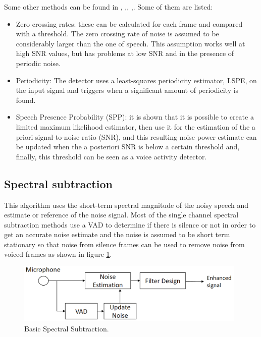 Some other methods can be found in \cite{Faneuff2002SpatialCar}, \cite{Rubio2007Two-microphoneEstimates},\cite{Rosca2002MultichannelEnvironments}, \cite{Gerkmann2011NoisePresence},\cite{Nelke2013DualProbability}. Some of them are listed:

\begin{itemize}
\item Zero crossing rates: these can be calculated for each frame and compared with a threshold. The zero crossing rate of noise is assumed to be considerably larger than the one of speech. This assumption works well at high SNR values, but has problems at low SNR and in the presence of periodic noise.

\item Periodicity: The detector uses a least-squares periodicity estimator, LSPE, on the input signal and triggers when a significant amount of periodicity is found.


\item Speech Presence Probability (SPP):  it is shown \cite{Gerkmann2011NoisePresence} that it is possible to create a limited maximum likelihood estimator, then use it for the estimation of the a priori signal-to-noise ratio (SNR), and this resulting noise power estimate can be updated when the a posteriori SNR is below a certain threshold and, finally, this threshold can be seen as a voice activity detector. 


\end{itemize}

\subsection{Spectral subtraction}

This algorithm uses the short-term spectral magnitude of the noisy speech and estimate or reference of the noise signal. Most of the single channel spectral subtraction methods use a VAD to determine if there is silence or not in order to get an accurate noise estimate and the noise is assumed to be short term stationary so that noise from silence frames can be used to remove noise from voiced frames as shown in figure \ref{fig:duagSS}.


\begin{figure}[!ht]
  \center
	\includegraphics[width=110mm]{State_of_Art/duagSS}
	\caption{Basic Spectral Subtraction.}
	\label{fig:duagSS}
\end{figure}


